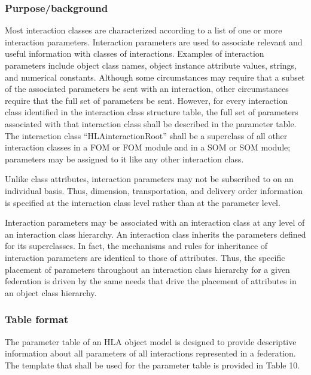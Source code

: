 \subsubsection{Purpose/background}
Most interaction classes are characterized according to a list of one or more interaction parameters. Interaction parameters are used to associate relevant and useful information with classes of interactions. Examples of interaction parameters include object class names, object instance attribute values, strings, and numerical constants. Although some circumstances may require that a subset of the associated parameters be sent with an interaction, other circumstances require that the full set of parameters be sent. However, for every interaction class identified in the interaction class structure table, the full set of parameters associated with that interaction class shall be described in the parameter table. The interaction class ``HLAinteractionRoot'' shall be a superclass of all other interaction classes in a FOM or FOM module and in a SOM or SOM module; parameters may be assigned to it like any other interaction class.

Unlike class attributes, interaction parameters may not be subscribed to on an individual basis. Thus, dimension, transportation, and delivery order information is specified at the interaction class level rather than at the parameter level.

\newpage
Interaction parameters may be associated with an interaction class at any level of an interaction class hierarchy. An interaction class inherits the parameters defined for its superclasses. In fact, the mechanisms and rules for inheritance of interaction parameters are identical to those of attributes. Thus, the specific placement of parameters throughout an interaction class hierarchy for a given federation is driven by the same needs that drive the placement of attributes in an object class hierarchy.

\subsubsection{Table format}
The parameter table of an HLA object model is designed to provide descriptive information about all parameters of all interactions represented in a federation. The template that shall be used for the parameter table is provided in Table 10.

